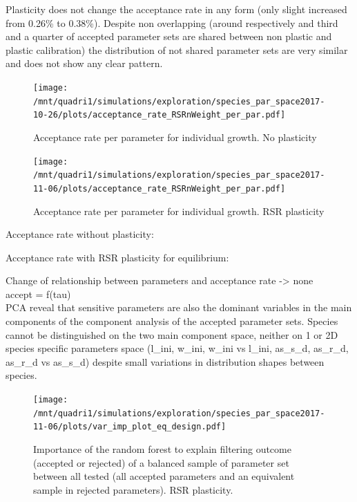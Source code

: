 \documentclass[review]{elsarticle}
\begin{document}
Plasticity does not change the acceptance rate in any form (only slight increased from 0.26\% to 0.38\%). Despite non overlapping (around respectively and third and a quarter of accepted parameter sets are shared between non plastic and plastic calibration) the distribution of not shared parameter sets are very similar and does not show any clear pattern. \\

\begin{figure}
\texttt{[image: /mnt/quadri1/simulations/exploration/species\_par\_space2017-10-26/plots/acceptance\_rate\_RSRnWeight\_per\_par.pdf]}
\caption{Acceptance rate per parameter for individual growth. No plasticity}
\end{figure}

\begin{figure}
\texttt{[image: /mnt/quadri1/simulations/exploration/species\_par\_space2017-11-06/plots/acceptance\_rate\_RSRnWeight\_per\_par.pdf]}
\caption{Acceptance rate per parameter for individual growth. RSR plasticity}
\end{figure}

Acceptance rate without plasticity:

Acceptance rate with RSR plasticity for equilibrium:


Change of relationship between parameters and acceptance rate -> none\\
accept = f(tau)\\

PCA reveal that sensitive parameters are also the dominant variables in the main components of the component analysis of the accepted parameter sets. Species cannot be distinguished on the two main component space, neither on 1 or 2D species specific parameters space (l\_ini, w\_ini, w\_ini vs l\_ini, as\_s\_d, as\_r\_d, as\_r\_d vs as\_s\_d) despite small variations in distribution shapes between species.\\



\begin{figure}
\texttt{[image: /mnt/quadri1/simulations/exploration/species\_par\_space2017-11-06/plots/var\_imp\_plot\_eq\_design.pdf]}
\caption{Importance of the random forest to explain filtering outcome (accepted or rejected) of a balanced sample of parameter set between all tested (all accepted parameters and an equivalent sample in rejected parameters).  RSR plasticity.}
\end{figure}
\end{document}
